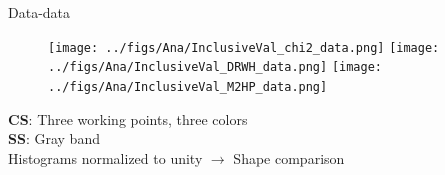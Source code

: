 \begin{frame}{Data-data}
\vspace{-.2cm}
\begin{figure}[!Hhtbp]
  \begin{center}
    \texttt{[image: ../figs/Ana/InclusiveVal\_chi2\_data.png]}
    \texttt{[image: ../figs/Ana/InclusiveVal\_DRWH\_data.png]}
    \texttt{[image: ../figs/Ana/InclusiveVal\_M2HP\_data.png]}
  \end{center}
\end{figure}

\vspace{-.2cm}
    \begin{block}{}\scriptsize
      \textbf{CS}: Three working points, three colors\\
      \textbf{SS}: Gray band\\
      Histograms normalized to unity $\to$ Shape comparison
    \end{block}

\end{frame}

